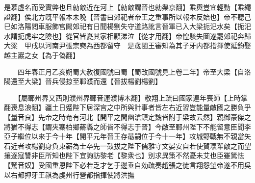 是慕虛名而受實弊也且勍敵近在河上【勍敵謂晉也勍渠京翻】乘輿豈宜輕動【乘繩證翻】俟北方旣平報本未晚【晉書曰郊祀者帝王之重事所以報本反始也】帝不聽己巳如洛陽閲車服飾宫闕郊祀有日聞楊劉失守道路訛言晉軍已入大梁扼汜水矣【扼汜水謂扼虎牢之險也】從官皆憂其家相顧涕泣【從才用翻】帝惶駭失圖遂罷郊祀奔歸大梁　甲戌以河南尹張宗奭為西都留守　是歲閩王審知為其子牙内都指揮使延鈞娶越主巖之女【為于偽翻】

　　四年春正月乙亥朔蜀大赦復國號曰蜀【蜀改國號見上卷二年】帝至大梁【自洛陽還至大梁】晉兵侵掠至鄆濮而還【晉拔楊劉楊劉】

　　【屬鄆州界又西則濮州界鄆音運濮博木翻】敬翔上疏曰國家連年喪師【上時掌翻喪息浪翻】疆土日蹙陛下居深宫之中所與計事者皆左右近習豈能量敵國之勝負乎【量音良】先帝之時奄有河北【開平之間幽滄鎮定魏皆附于梁故云然】親御豪傑之將猶不得志【謂夾寨柏鄉蓨縣之師皆不得志于晉】今敵至鄆州陛下不能留意臣聞李亞子繼位以來于今十年【開平元年晉王存朂嗣位于今十一年】攻城野戰無不親當矢石近者攻楊劉身負束薪為士卒先一鼓拔之陛下儒雅守文晏安自若使賀瓌輩敵之而望攘逐寇讐非臣所知也陛下宜詢訪黎老【黎衆也】别求異策不然憂未艾也臣雖駑怯【駑音奴】受國重恩陛下必若乏才乞于邊垂自効疏奏趙張之徒言翔怨望帝遂不用吳以右都押牙王祺為虔州行營都指揮使將洪撫

